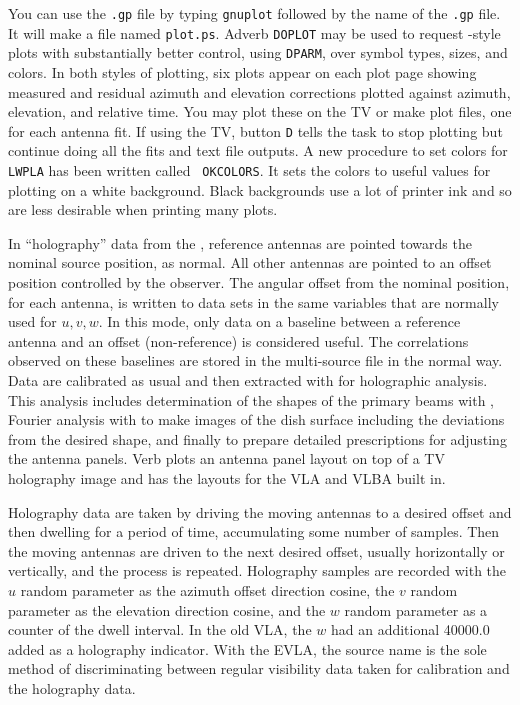 You can use the {\tt .gp} file by typing {\tt gnuplot} followed by the
name of the {\tt .gp} file.  It will make a file named {\tt plot.ps}.
Adverb {\tt DOPLOT} may be used to request \AIPS-style plots with
substantially better control, using {\tt DPARM}, over symbol types,
sizes, and colors.  In both styles of plotting, six plots appear on
each plot page showing measured and residual azimuth and elevation
corrections plotted against azimuth, elevation, and relative time.
You may plot these on the TV or make plot files, one for each antenna
fit.  If using the TV, button {\tt D} tells the task to stop plotting
but continue doing all the fits and text file outputs.  A new
procedure to set colors for {\tt LWPLA} has been written called {\tt
OKCOLORS}\@.  It sets the colors to useful values for plotting on a
white background.  Black backgrounds use a lot of printer ink and so
are less desirable when printing many plots.

\vfill\eject
{}

     In ``holography'' data from the , reference antennas
are pointed towards the nominal source position, as normal.  All
other antennas are pointed to an offset position controlled by
the observer.  The angular offset from the nominal position, for
each antenna, is written to data sets in the same variables that are
normally used for $u,v,w$.  In this mode, only data on a baseline
between a reference antenna and an offset (non-reference) is
considered useful.  The correlations observed on these baselines
are stored in the multi-source file in the normal way.  Data are
calibrated as usual and then extracted with {\tt {}} for
holographic analysis.  This analysis includes determination of the
shapes of the primary beams with {\tt {}}, Fourier analysis
with {\tt {}} to make images of the dish surface including
the deviations from the desired shape, and finally {\tt {}}
to prepare detailed prescriptions for adjusting the antenna panels.
Verb {\tt {}} plots an antenna panel layout on top of a
TV holography image and has the layouts for the VLA and VLBA built in.

     Holography data are taken by driving the moving antennas to a
desired offset and then dwelling for a period of time, accumulating
some number of samples.  Then the moving antennas are driven to the
next desired offset, usually horizontally or vertically, and the
process is repeated.  Holography samples are recorded with the $u$
random parameter as the azimuth offset direction cosine, the $v$
random parameter as the elevation direction cosine, and the $w$ random
parameter as a counter of the dwell interval.  In the old VLA, the $w$
had an additional 40000.0 added as a holography indicator.  With the
EVLA, the source name is the sole method of discriminating between
regular visibility data taken for calibration and the holography data.

